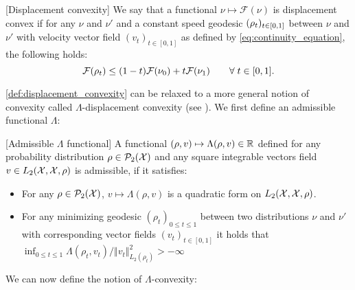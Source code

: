 \begin{definition}\label{def:displacement_convexity}[Displacement convexity] 
We say that a functional $\nu\mapsto\mathcal{F}(\nu)$ is displacement convex
	if for any $\nu$ and $\nu'$ and a constant speed geodesic $(\text{\ensuremath{\rho_{t}}})_{t \in [0,1]}$
	between $\nu$ and $\nu'$ with velocity vector field $(v_{t})_{t \in [0,1]}$ as defined by \cref{eq:continuity_equation},
	the following holds:
	\begin{equation}\label{eq:lambda_displacement_convex}
		{{\mathcal F}}(\rho_{t})\leq(1-t){{\mathcal F}}(\nu_{0})+t{{\mathcal F}}(\nu_{1}) \qquad\forall\; t\in[0,1].
	\end{equation}
\end{definition}
\cref{def:displacement_convexity} can be relaxed to a more general notion of convexity called $\Lambda$-displacement convexity (see \cite[Definition 16.5]{Villani:2009}). We first define an admissible functional $\Lambda$:
\begin{definition}\label{def:conditions_lambda}[Admissible $\Lambda$ functional]
	A functional $(\rho,v)\mapsto \Lambda(\rho,v) \in {{\mathbb R}}$  defined for any probability distribution $\rho\in \mathcal{P}_2({{\mathcal X}})$ and any square integrable vectors field $v\in L_2({{\mathcal X}},{{\mathcal X}},\rho)$ is admissible, if it satisfies:
	\begin{itemize}
	\item For any $\rho \in \mathcal{P}_2({{\mathcal X}})$,  $v\mapsto \Lambda(\rho,v)$ is a quadratic form on $L_2({{\mathcal X}},{{\mathcal X}},\rho)$.
	\item For any minimizing geodesic $(\rho_t)_{0\leq t\leq 1}$ between two distributions $\nu$ and $\nu'$ with corresponding vector fields $(v_t)_{t \in [0,1]}$ it holds that $\inf_{0\leq t\leq 1}\Lambda(\rho_t,v_t)/\Vert v_t\Vert_{L_{2}(\rho_t)}^{2}>-\infty$ 
\end{itemize}
\end{definition}
We can now define the notion of $\Lambda$-convexity:
